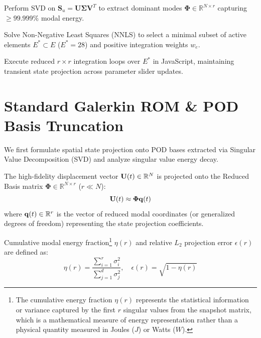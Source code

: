 \begin{tcolorbox}[colback=lightbg, colframe=primaryblue, title={\textbf{Step 3: Proper Orthogonal Decomposition \& Basis Construction (Offline)}}, fonttitle=\bfseries]
    Perform SVD on $\mathbf{S}_u = \mathbf{U} \boldsymbol{\Sigma} \mathbf{V}^T$ to extract dominant modes $\boldsymbol{\Phi} \in \mathbb{R}^{N \times r}$ capturing $\ge 99.999\%$ modal energy.
\end{tcolorbox}

\begin{tcolorbox}[colback=lightbg, colframe=primaryblue, title={\textbf{Step 4: Hyper-Reduction Training \& NNLS Optimization (Offline)}}, fonttitle=\bfseries]
    Solve Non-Negative Least Squares (NNLS) to select a minimal subset of active elements $E^* \subset E$ ($E^*=28$) and positive integration weights $w_e$.
\end{tcolorbox}

\begin{tcolorbox}[colback=lightbg, colframe=primaryblue, title={\textbf{Step 5: Real-Time Interactive Simulation (Online)}}, fonttitle=\bfseries]
    Execute reduced $r \times r$ integration loops over $E^*$ in JavaScript, maintaining transient state projection across parameter slider updates.
\end{tcolorbox}

\section{Standard Galerkin ROM \& POD Basis Truncation}
\label{sec:galerkin_rom}

We first formulate spatial state projection onto POD bases extracted via Singular Value Decomposition (SVD) and analyze singular value energy decay.

The high-fidelity displacement vector $\mathbf{U}(t) \in \mathbb{R}^N$ is projected onto the Reduced Basis matrix $\boldsymbol{\Phi} \in \mathbb{R}^{N \times r}$ ($r \ll N$):
\begin{equation}
    \mathbf{U}(t) \approx \boldsymbol{\Phi} \mathbf{q}(t)
\end{equation}
where $\mathbf{q}(t) \in \mathbb{R}^r$ is the vector of reduced modal coordinates (or generalized degrees of freedom) representing the state projection coefficients.

Cumulative modal energy fraction\footnote{The cumulative energy fraction $\eta(r)$ represents the statistical information or variance captured by the first $r$ singular values from the snapshot matrix, which is a mathematical measure of energy representation rather than a physical quantity measured in Joules ($J$) or Watts ($W$).} $\eta(r)$ and relative $L_2$ projection error $\epsilon(r)$ are defined as:
\begin{equation}
    \eta(r) = \frac{\sum_{i=1}^{r} \sigma_i^2}{\sum_{j=1}^{d} \sigma_j^2}, \quad \epsilon(r) = \sqrt{1 - \eta(r)}
\end{equation}

